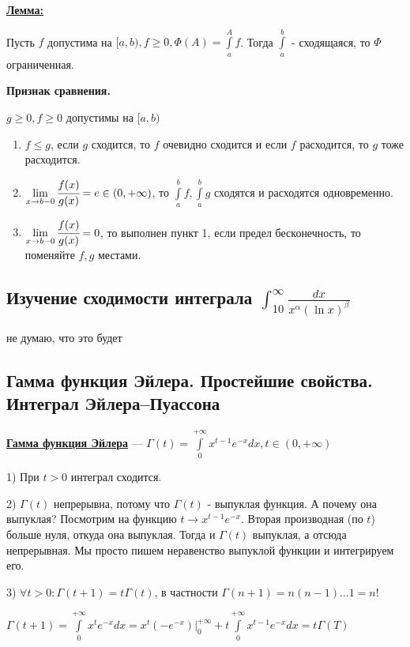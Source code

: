 \documentclass{article}
\newcommand{\integral}[2]{\displaystyle\int\limits_{#1}^{#2}}
\newcommand{\deff}[1]{\underline{\textbf{#1}}}
\newcommand{\thmm}[1]{\underline{\textbf{#1}}}
\begin{document}
\thmm{Лемма:}

Пусть $f$ допустима на $[a,b), f\geq 0, \varPhi(A) = \integral{a}{A}f$.  Тогда $\integral{a}{b}$ - сходящаяся, то $\varPhi$ ограниченная.


\textbf{Признак сравнения.}

$g \geq 0 ,f \geq 0$ допустимы на $[a,b)$

\begin{enumerate}
    \item $f\leq g$, если $g$ сходится, то $f$ очевидно сходится и если $f$ расходится, то $g$ тоже расходится.
    \item $\lim\limits_{x\rightarrow b-0} \cfrac{f(x)}{g(x)} = e\in (0, +\infty)$, то $\integral{a}{b}f,\integral{a}{b}g$ сходятся и расходятся одновременно.
    \item $\lim\limits_{x\rightarrow b-0}\cfrac{f(x)}{g(x)}=0$, то выполнен пункт 1, если предел бесконечность, то поменяйте $f,g$ местами.
\end{enumerate}

\subsection{Изучение сходимости интеграла $\int_{10}^\infty \frac{dx}{x^\alpha (\ln x)^\beta}$}

не думаю, что это будет

\subsection{Гамма функция Эйлера. Простейшие свойства. Интеграл Эйлера--Пуассона}

\deff{Гамма функция Эйлера} --- $\Gamma(t) = \integral{0}{+\infty}x^{t-1}e^{-x} dx, t \in (0,+\infty)$

1) При $t>0$ интеграл сходится. 

2) $\Gamma(t)$ непрерывна, потому что $\Gamma(t)$ - выпуклая функция. А почему она выпуклая? Посмотрим на функцию $t\rightarrow x^{t-1}e^{-x}$. Вторая производная (по $t$) больше нуля, откуда она выпуклая. Тогда и $\Gamma(t)$ выпуклая, а отсюда непрерывная. Мы просто пишем неравенство выпуклой функции и интегрируем его.

3) $\forall t >0: \Gamma(t+1) = t \Gamma(t)$, в частности $\Gamma(n+1) = n (n-1) \ldots 1 = n!$

$\Gamma(t+1) = \integral{0}{+\infty}x^t e^{-x} dx = x^t (-e^{-x})\Big|^{+\infty}_{0} + t \integral{0}{+\infty}x^{t-1}e^{-x} dx= t\Gamma(T)$
\end{document}
